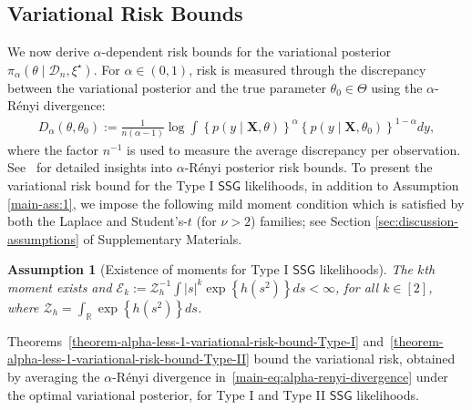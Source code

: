 \documentclass[12pt]{article}
\newtheorem{assumption}{Assumption}
\numberwithin{equation}{section}
\newcommand{\ssg}{\mathsf{SSG}}
\begin{document}

\subsection{Variational Risk Bounds}\label{subsec:var-risk}

We now derive $\alpha$-dependent risk bounds for the variational posterior $\pi_{\alpha}(\theta\mid\mathcal D_n,\xi^\star)$. For $\alpha\in(0,1)$, risk is measured through the discrepancy between the variational posterior and the true parameter $\theta_0\in\Theta$ using the $\alpha$-R\'enyi divergence:
%
\begin{align}\label{main-eq:alpha-renyi-divergence}
    D_{\alpha}(\theta, \theta_0) := \frac{1}{n(\alpha-1)}\log \int\left\{p(y \mid \mathbf{X}, \theta)\right\}^{\alpha}\left\{p(y \mid \mathbf{X}, \theta_0)\right\}^{1-\alpha}dy,
\end{align}
%
where the factor $n^{-1}$ is used to measure the average discrepancy per observation. See~\cite{Bayesian-fractional-posterior} for detailed insights into $\alpha$-R\'{e}nyi posterior risk bounds. To present the variational risk bound for the Type I $\ssg$ likelihoods, in addition to Assumption \ref{main-ass:1}, we impose the following mild {moment condition} which is satisfied by both the Laplace and Student’s-$t$ (for $\nu > 2$) families; see Section \ref{sec:discussion-assumptions} of Supplementary Materials.

\begin{assumption}[Existence of moments for Type I $\mathsf{SSG}$ likelihoods]
\label{main-ass:3}
The $k$th moment exists and $\mathscr{E}_k := \mathcal{Z}_h^{-1}\int |s|^k\exp\left\{h(s^2)\right\}ds  < \infty$, for all $k\in [2]$, where $\mathcal{Z}_h = \int_{\mathbb{R}} \exp\left\{h(s^2)\right\}ds$.
\end{assumption}

Theorems~\ref{theorem-alpha-less-1-variational-risk-bound-Type-I} and~\ref{theorem-alpha-less-1-variational-risk-bound-Type-II} bound the variational risk, obtained by averaging the $\alpha$-R\'enyi divergence in~\eqref{main-eq:alpha-renyi-divergence} under the optimal variational posterior, for Type I and Type II $\ssg$ likelihoods.
\end{document}
